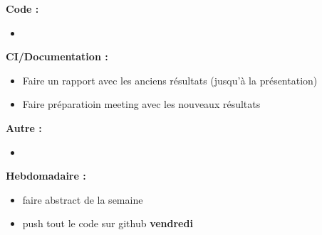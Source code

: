 \textbf{Code :}
\begin{itemize}[label=$\square$] 
	\item 
\end{itemize}
\textbf{CI/Documentation :}
\begin{itemize}[label=$\square$] 
	\item Faire un rapport avec les anciens résultats (jusqu'à la présentation)
	\item Faire préparatioin meeting avec les nouveaux résultats
\end{itemize}
\textbf{Autre :}
\begin{itemize}[label=$\square$] 
	\item 
\end{itemize}
\textbf{Hebdomadaire :}
\begin{itemize}[label=$\square$] 
	\item faire abstract de la semaine 
	\item push tout le code sur github \textbf{vendredi}
\end{itemize}
